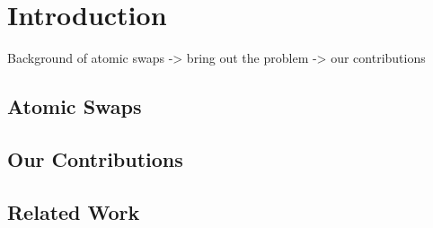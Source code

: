 
\section{Introduction}

\begin{todobox}
    Background of atomic swaps -> bring out the problem -> our contributions
\end{todobox}

\subsection{Atomic Swaps}

\subsection{Our Contributions}

\subsection{Related Work}